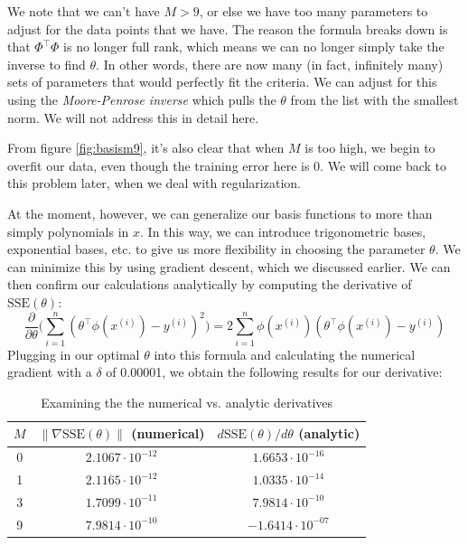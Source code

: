 \documentclass[10pt,letterpaper]{article}
\begin{document}
We note that we can't have $M > 9$, or else we have too many parameters to adjust for the data points that we have. The reason the formula breaks down is that $\Phi^\intercal\Phi$ is no longer full rank, which means we can no longer simply take the inverse to find $\theta$. In other words, there are now many (in fact, infinitely many) sets of parameters that would perfectly fit the criteria. We can adjust for this using the \textit{Moore-Penrose inverse} which pulls the $\theta$ from the list with the smallest norm. We will not address this in detail here.

From figure \ref{fig:basism9}, it's also clear that when $M$ is too high, we begin to overfit our data, even though the training error here is $0$. We will come back to this problem later, when we deal with regularization.

At the moment, however, we can generalize our basis functions to more than simply polynomials in $x$. In this way, we can introduce trigonometric bases, exponential bases, etc. to give us more flexibility in choosing the parameter $\theta$. 
We can minimize this by using gradient descent, which we discussed earlier. We can then confirm our calculations analytically by computing the derivative of $\text{SSE}(\theta)$:
\[ \frac{\partial}{\partial\theta}\Big(\sum_{i=1}^n (\theta^\intercal\phi(x^{(i)}) - y^{(i)})^2\Big) = 2\sum_{i=1}^n \phi(x^{(i)})(\theta^\intercal\phi(x^{(i)}) - y^{(i)}) \]
Plugging in our optimal $\theta$ into this formula and calculating the numerical gradient with a $\delta$ of 0.00001, we obtain the following results for our derivative:
\begin{table}[h]
\centering
\caption{Examining the the numerical vs. analytic derivatives}
\begin{tabular}{c|c|c}
$M$& $\lVert\nabla\text{SSE}(\theta)\rVert$ (numerical) & $d\text{SSE} (\theta)/d\theta$ (analytic)\\\hline
0       &  $2.1067\cdot10^{-12}$  & $1.6653\cdot10^{-16}$   \\
1       & $2.1165\cdot10^{-12}$  & $1.0335\cdot10^{-14}$ \\
3       & $1.7099\cdot10^{-11}$ & $7.9814\cdot10^{-10}$  \\
9      &   $7.9814\cdot 10^{-10}$    & $-1.6414\cdot 10^{-07}$
\end{tabular}
\end{table}

\end{document}
